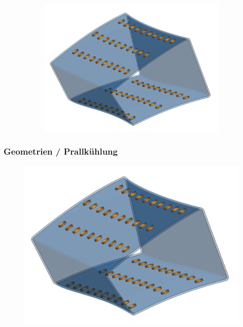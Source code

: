 \documentclass[8pt, aspectratio=169]{beamer}
\begin{document}
\begin{frame}
\begin{figure}[H]
\begin{subfigure}{.3\textwidth}
			\includegraphics[width=\textwidth]{../../tec/impingement/01.png}
		\end{subfigure}
	\end{figure}
	\vfill
\end{frame}

\begin{frame}
	\frametitle{Geometrien / Prallkühlung}
	\vspace{-1cm}\hspace{-0.5cm}
	\begin{figure}[H]
		\includegraphics[width=.66\textwidth]{../../tec/impingement/01.png}
	\end{figure}
	\vfill
\end{frame}
\end{document}
